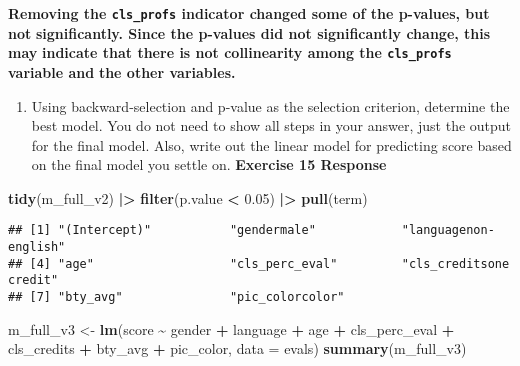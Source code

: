 \documentclass[
]{article}
\newenvironment{Shaded}{\begin{snugshade}}{\end{snugshade}}
\newcommand{\AttributeTok}[1]{\textcolor[rgb]{0.13,0.29,0.53}{#1}}
\newcommand{\FloatTok}[1]{\textcolor[rgb]{0.00,0.00,0.81}{#1}}
\newcommand{\FunctionTok}[1]{\textcolor[rgb]{0.13,0.29,0.53}{\textbf{#1}}}
\newcommand{\NormalTok}[1]{#1}
\newcommand{\OtherTok}[1]{\textcolor[rgb]{0.56,0.35,0.01}{#1}}
\newcommand{\SpecialCharTok}[1]{\textcolor[rgb]{0.81,0.36,0.00}{\textbf{#1}}}
\providecommand{\tightlist}{%
  \setlength{\itemsep}{0pt}\setlength{\parskip}{0pt}}
\begin{document}
\textbf{Removing the \texttt{cls\_profs} indicator changed some of the
p-values, but not} \textbf{significantly. Since the p-values did not
significantly change, this may} \textbf{indicate that there is not
collinearity among the \texttt{cls\_profs} variable and} \textbf{the
other variables.}

\begin{enumerate}
\def\labelenumi{\arabic{enumi}.}
\setcounter{enumi}{14}
\tightlist
\item
  Using backward-selection and p-value as the selection criterion,
  determine the best model. You do not need to show all steps in your
  answer, just the output for the final model. Also, write out the
  linear model for predicting score based on the final model you settle
  on. \textbf{Exercise 15 Response}
\end{enumerate}

\begin{Shaded}
\begin{Highlighting}[]
\FunctionTok{tidy}\NormalTok{(m\_full\_v2) }\SpecialCharTok{|\textgreater{}} 
  \FunctionTok{filter}\NormalTok{(p.value }\SpecialCharTok{\textless{}} \FloatTok{0.05}\NormalTok{) }\SpecialCharTok{|\textgreater{}} 
  \FunctionTok{pull}\NormalTok{(term)}
\end{Highlighting}
\end{Shaded}

\begin{verbatim}
## [1] "(Intercept)"           "gendermale"            "languagenon-english"  
## [4] "age"                   "cls_perc_eval"         "cls_creditsone credit"
## [7] "bty_avg"               "pic_colorcolor"
\end{verbatim}

\begin{Shaded}
\begin{Highlighting}[]
\NormalTok{m\_full\_v3 }\OtherTok{\textless{}{-}} \FunctionTok{lm}\NormalTok{(score }\SpecialCharTok{\textasciitilde{}}\NormalTok{ gender }\SpecialCharTok{+}\NormalTok{ language }\SpecialCharTok{+}\NormalTok{ age }\SpecialCharTok{+}\NormalTok{ cls\_perc\_eval }\SpecialCharTok{+} 
\NormalTok{                  cls\_credits }\SpecialCharTok{+}\NormalTok{ bty\_avg }\SpecialCharTok{+}\NormalTok{ pic\_color, }\AttributeTok{data =}\NormalTok{ evals)}
\FunctionTok{summary}\NormalTok{(m\_full\_v3)}
\end{Highlighting}
\end{Shaded}
\end{document}
